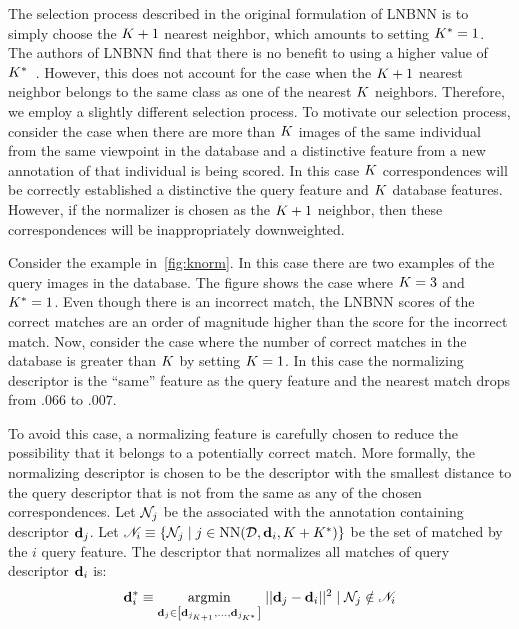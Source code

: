             The selection process described in the original formulation of LNBNN is to simply choose the $K +
              1$\th{} nearest neighbor, which amounts to setting $K^{*}=1$.
            The authors of LNBNN find that there is no benefit to using a higher value of
              $K^{*}$~\cite{mccann_local_2012}.
            However, this does not account for the case when the $K + 1$\th{} nearest neighbor belongs to the
              same class as one of the nearest $K$ neighbors.
            Therefore, we employ a slightly different selection process.
            To motivate our selection process, consider the case when there are more than $K$ images of the same
              individual from the same viewpoint in the database and a distinctive feature from a new annotation of
              that individual is being scored.
            In this case $K$ correspondences will be correctly established a distinctive the query feature and
              $K$ database features.
            However, if the normalizer is chosen as the $K + 1$ neighbor, then these correspondences will be
              inappropriately downweighted.
              
            Consider the example in~\cref{fig:knorm}.
            In this case there are two examples  of the query images in the database.
            The figure shows the case where $K=3$ and $K^{*}=1$.
            Even though there is an incorrect match, the LNBNN scores of the correct matches are an order of
              magnitude higher than the score for the incorrect match.
            Now, consider the case where the number of correct matches in the database is greater than $K$ by
              setting $K=1$.
            In this case the normalizing descriptor is the ``same'' feature as the query feature and the nearest
              match drops from $.066$ to $.007$.

            \knorm{}

            To avoid this case, a normalizing feature is carefully chosen to reduce the possibility that it
              belongs to a potentially correct match.
            More formally, the normalizing descriptor is chosen to be the descriptor with the smallest distance
              to the query descriptor that is not from the same \name{} as any of the chosen correspondences.
            Let $\mathcal{N}_j$ be the \name{} associated with the annotation containing descriptor $\mathbf{d}_j$.
            Let %
            $\mathscr{N}_i \equiv \left\{\mathcal{N}_j \mid j \in \operatorname{NN}(\mathcal{D}, \mathbf{d}_i, K + K^{*})\right\}$
            be the set of \names{} matched by the $i$\th{} query feature.
            The descriptor that normalizes all matches of query descriptor $\mathbf{d}_i$ is:
              \begin{equation}
                  \mathbf{d}^{*}_{i} \equiv 
                  \underset{\mathbf{d}_j \in \left[\mathbf{d}_{{j_{K + 1}}}, \ldots{}, \mathbf{d}_{j_{K^{*}}}\right]}{\operatorname{argmin}}\;
                  ||\mathbf{d}_j - \mathbf{d}_i||^2 \mid \mathcal{N}_j \notin \mathscr{N}_i
              \end{equation}

